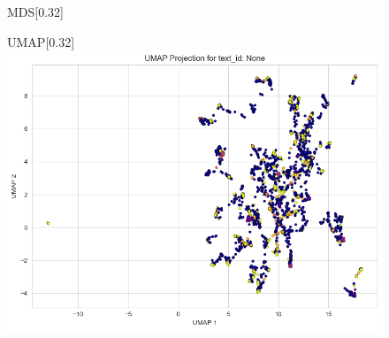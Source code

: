 \documentclass{article}
\begin{document}
\begin{figure}[H]
\begin{subcaptionbox}{MDS\label{fig:sl_b}}[0.32\textwidth]
  \end{subcaptionbox}
\hfill
  \begin{subcaptionbox}{UMAP\label{fig:sl_b}}[0.32\textwidth]
    {\centering\includegraphics[width=\linewidth]{plots/cluster_examples/hdbs_500examples_lev2D_trimmed_UMAP.png}}
  \end{subcaptionbox}

\end{figure}
\end{document}
